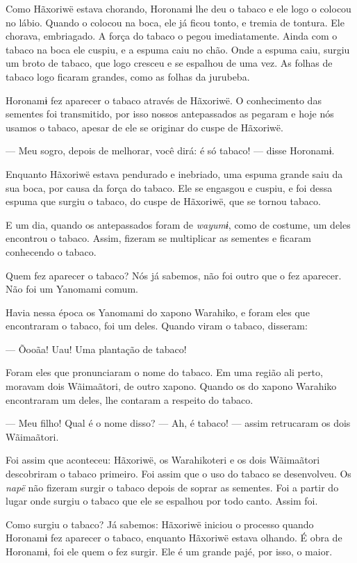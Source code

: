 Como Hãxoriwë estava chorando, Horonamɨ lhe deu o tabaco e ele
logo o colocou no lábio. Quando o colocou na boca, ele já ficou tonto, e
tremia de tontura. Ele chorava, embriagado. A força do tabaco o pegou
imediatamente. Ainda com o tabaco na boca ele cuspiu, e a espuma caiu no
chão. Onde a espuma caiu, surgiu um broto de tabaco, que logo cresceu e
se espalhou de uma vez. As folhas de tabaco logo ficaram grandes, como as folhas da jurubeba. 

Horonamɨ fez aparecer o tabaco através de Hãxoriwë. O conhecimento das sementes foi transmitido, por isso nossos antepassados as pegaram e hoje nós usamos o tabaco, apesar de ele se originar do cuspe de Hãxoriwë. 

--- Meu sogro, depois de melhorar, você dirá: é só tabaco! --- disse
Horonamɨ. 

Enquanto Hãxoriwë estava pendurado e inebriado, uma espuma grande saiu
da sua boca, por causa da força do tabaco. Ele se engasgou e cuspiu, e
foi dessa espuma que surgiu o tabaco, do cuspe de Hãxoriwë, que se tornou
tabaco. 

E um dia, quando os antepassados foram de \emph{wayumɨ}, como de
costume, um deles encontrou o tabaco. Assim, fizeram se multiplicar as
sementes e ficaram conhecendo o tabaco. 

Quem fez aparecer o tabaco? Nós já sabemos, não foi outro que o fez
aparecer. Não foi um Yanomami comum. 

Havia nessa época os Yanomami do xapono\emph{ }Warahiko, e foram eles
que encontraram o tabaco, foi um deles. Quando viram o tabaco,
disseram: 

--- Õooãa! Uau! Uma plantação de tabaco! 

Foram eles que pronunciaram o nome do tabaco. Em uma região
ali perto, moravam dois Wãimaãtori, de outro xapono. Quando os do
xapono\emph{ }Warahiko encontraram um deles, lhe contaram a respeito do
tabaco. 

--- Meu filho! Qual é o nome disso? 
--- Ah, é tabaco! --- assim retrucaram os dois Wãimaãtori. 

Foi assim que aconteceu: Hãxoriwë, os Warahikoteri e os dois Wãimaãtori
descobriram o tabaco primeiro. Foi assim que o uso do tabaco se
desenvolveu. Os \emph{napë} não fizeram surgir o tabaco depois de soprar
as sementes. Foi a partir do lugar onde surgiu o tabaco que ele se
espalhou por todo canto. Assim foi. 

Como surgiu o tabaco? Já sabemos: Hãxoriwë iniciou o processo quando
Horonamɨ fez aparecer o tabaco, enquanto Hãxoriwë estava olhando. É obra
de Horonamɨ, foi ele quem o fez surgir. Ele é um grande pajé, por isso,
o maior. 

